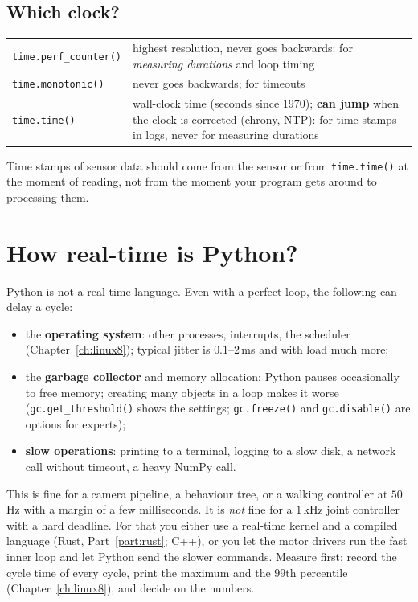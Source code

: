 \subsection*{Which clock?}
\begin{center}
\renewcommand{\arraystretch}{1.2}
\begin{tabular}{p{4.0cm}p{9.0cm}}
\texttt{time.perf\_counter()} & highest resolution, never goes backwards: for \emph{measuring durations} and loop timing\\
\texttt{time.monotonic()} & never goes backwards; for timeouts\\
\texttt{time.time()} & wall-clock time (seconds since 1970); \textbf{can jump} when the clock is corrected (chrony, NTP): for time stamps in logs, never for measuring durations\\
\end{tabular}
\end{center}
Time stamps of sensor data should come from the sensor or from \texttt{time.time()} at the moment of reading, not from the moment your program gets around to processing them.

\section*{How real-time is Python?}
Python is not a real-time language. Even with a perfect loop, the following can delay a cycle:
\begin{itemize}[nosep]
  \item the \textbf{operating system}: other processes, interrupts, the scheduler (Chapter~\ref{ch:linux8}); typical jitter is $0.1$--$2$\,ms and with load much more;
  \item the \textbf{garbage collector} and memory allocation: Python pauses occasionally to free memory; creating many objects in a loop makes it worse (\texttt{gc.get\_threshold()} shows the settings; \texttt{gc.freeze()} and \texttt{gc.disable()} are options for experts);
  \item \textbf{slow operations}: printing to a terminal, logging to a slow disk, a network call without timeout, a heavy NumPy call.
\end{itemize}
This is fine for a camera pipeline, a behaviour tree, or a walking controller at $50$\,Hz with a margin of a few milliseconds. It is \emph{not} fine for a $1$\,kHz joint controller with a hard deadline. For that you either use a real-time kernel and a compiled language (Rust, Part~\ref{part:rust}; C++), or you let the motor drivers run the fast inner loop and let Python send the slower commands. Measure first: record the cycle time of every cycle, print the maximum and the $99$th percentile (Chapter~\ref{ch:linux8}), and decide on the numbers.

